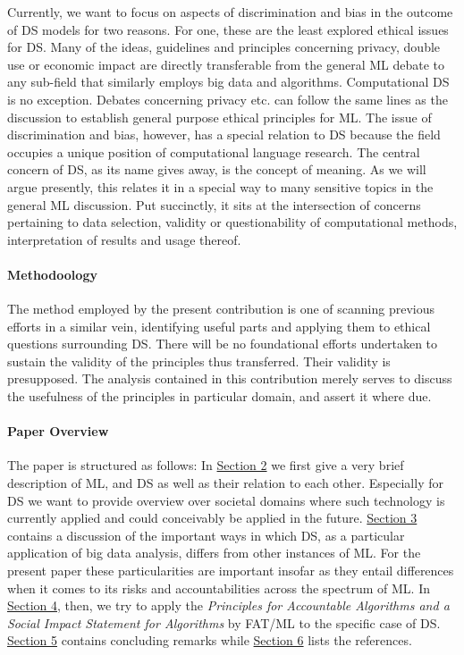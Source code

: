 \documentclass{article}
\begin{document}
Currently, we want to focus on aspects of discrimination and bias in the outcome of DS models for two reasons. For one, these are the least explored ethical issues for DS. Many of the ideas, guidelines and principles concerning privacy, double use or economic impact are directly transferable from the general ML debate to any sub-field that similarly employs big data and algorithms. Computational DS is no exception. Debates concerning privacy etc. can follow the same lines as the discussion to establish general purpose ethical principles for ML. The issue of discrimination and bias, however, has a special relation to DS because the field occupies a unique position of computational language research. The central concern of DS, as its name gives away, is the concept of meaning. As we will argue presently, this relates it in a special way to many sensitive topics in the general ML discussion. Put succinctly, it sits at the intersection of concerns pertaining to data selection, validity or questionability of computational methods, interpretation of results and usage thereof.

\paragraph{Methodoology}
The method employed by the present contribution is one of scanning previous efforts in a similar vein, identifying useful parts and applying them to ethical questions surrounding DS. There will be no foundational efforts undertaken to sustain the validity of the principles thus transferred.  Their validity is presupposed. The analysis contained in this contribution merely serves to discuss the usefulness of the principles in particular domain, and assert it where due.

\paragraph{Paper Overview}
The paper is structured as follows: In \hyperlink{sec2}{Section 2} we first give a very brief description of ML,  and DS as well as their relation to each other. Especially for DS we want to provide overview over societal domains where such technology is currently applied and could conceivably be applied in the future. \hyperlink{sec3}{Section 3} contains a discussion of the important ways in which DS, as a particular application of big data analysis, differs from other instances of ML. For the present paper these particularities are important insofar as they entail differences when it comes to its risks and accountabilities across the spectrum of ML. In \hyperlink{sec4}{Section 4}, then, we try to apply the \emph{Principles for Accountable Algorithms and a Social Impact Statement for Algorithms} by FAT/ML to the specific case of DS. \hyperlink{sec5}{Section 5} contains concluding remarks while \hyperlink{sec6}{Section 6} lists the references.
\end{document}
